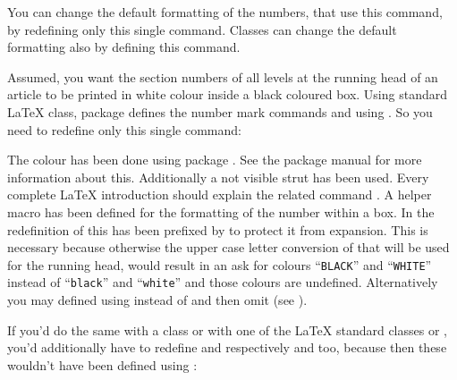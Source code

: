You can change the default formatting of the numbers, that use this command,
by redefining only this single command. Classes can change the default
formatting also by defining this command.%
%
\begin{Example}
  Assumed, you want the section numbers of all levels at the running head of
  an article to be printed in white colour inside a black coloured box. Using
  standard \LaTeX{}  class, package  defines
  the number mark commands  and
   using . So you need to
  redefine only this single command:
  The colour has been done using package
  . See the package manual for more
  information about this. Additionally a not visible strut has been
  used. Every complete \LaTeX{} introduction should explain the related
  command . A helper macro  has been defined for
  the formatting of the number within a box. In the redefinition of
   this has been prefixed by
   to protect it from expansion. This is necessary because
  otherwise the upper case letter conversion of  that
  will be used for the running head, would result in an ask for colours
  ``\texttt{BLACK}'' and ``\texttt{WHITE}'' instead of ``\texttt{black}'' and
  ``\texttt{white}'' and those colours are undefined. Alternatively you may
  defined  using  instead of
   and then omit  (see
  \cite{latex:clsguide}).

  If you'd do the same with a \KOMAScript{} class or with one of the \LaTeX{}
  standard classes  or , you'd additionally have to
  redefine  and 
  respectively  and  too,
  because then these wouldn't have been defined using
  :
\end{Example}

